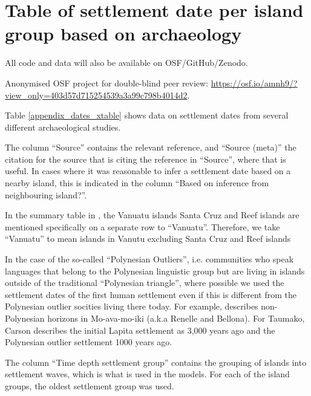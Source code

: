 \documentclass[unnumsec,webpdf,modern,medium]{oup-authoring-template}
\begin{document}
\begin{appendices}
\begin{landscape}
\label{appendix_pol_complex}


 \end{landscape}


\section{Table of settlement date per island group based on archaeology}
\singlespacing
\label{dates_table_appendix}
All code and data will also be available on OSF/GitHub/Zenodo.

Anonymised OSF project for double-blind peer review: \url{https://osf.io/amnh9/?view_only=403d57d715254539a3a99c798b4014d2}.

Table \ref{appendix_dates_xtable} shows data on settlement dates from several different archaeological studies. 

The column ``Source'' contains the relevant reference, and ``Source (meta)'' the citation for the source that is citing the reference in ``Source'', where that is useful. In cases where it was reasonable to infer a settlement date based on a nearby island, this is indicated in the column ``Based on inference from neighbouring island?''.

In the summary table in \citet{rieth_cochrane_2018},  the Vanuatu islands Santa Cruz and Reef islands are mentioned specifically on a separate row to ``Vanuatu''. Therefore, we take ``Vanuatu'' to mean islands in Vanutu excluding Santa Cruz and Reef islands 

In the case of the so-called ``Polynesian Outliers'', i.e. communities who speak languages that belong to the Polynesian linguistic group but are living in islands outside of the traditional ``Polynesian triangle'', where possible we used the settlement dates of the first human settlement even if this is different from the Polynesian outlier socities living there today. For example, \citet{carson2012recent} describes non-Polynesian horizons in Mo-ava-mo-iki (a.k.a Renelle and Bellona). For Taumako, Carson describes the initial Lapita settlement as 3,000 years ago and the Polynesian outlier settlement 1000 years ago.

The column ``Time depth settlement group'' contains the grouping of islands into settlement waves, which is what is used in the models. For each of the island groups, the oldest settlement group was used.

\begin{landscape}

\end{landscape}



\end{appendices}
\end{document}
